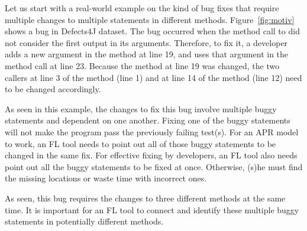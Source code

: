 Let us start with a real-world example on the kind of bug fixes that
require multiple changes to multiple statements in different methods.
Figure~\ref{fig:motiv} shows a bug in Defects4J dataset. The bug
occurred when the method call to  did not
consider the first output in its arguments. Therefore, to fix it, a
developer adds a new argument in the method  at line
19, and uses that argument in the method call  at line 23. Because the method  at
line 19 was changed, the two callers at line 3 of the method
 (line 1) and at line 14 of the method 
(line 12) need to be changed accordingly.



 As seen in
this example, the changes to fix this bug involve multiple buggy
statements and dependent on one another. Fixing one of the buggy
statements will not make the program pass the previously failing
test(s). For an APR model to work, an FL tool needs to point out all
of those buggy statements to be changed in the same fix. For effective
fixing by developers, an FL tool also needs point out all the buggy
statements to be fixed at once. Otherwise, (s)he must find
the missing locations or waste time with incorrect ones.

 As seen, this
bug requires the changes to three different methods at the same time.
It is important for an FL tool to connect and identify these multiple
buggy statements in potentially different methods.

